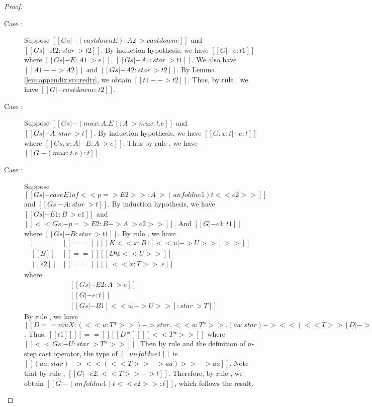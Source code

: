 \begin{proof}
\begin{description}
        \item[Case :] Suppose $[[Gs |- (castdown E) : A2 ~> castdown e]]$ and $[[Gs |- A2 : star ~> t2]]$. By induction hypothesis, we have $[[G |- e : t1]]$ where $[[Gs |- E : A1 ~> e]]$, $[[Gs |- A1 : star ~> t1]]$. We also have $[[A1 --> A2]]$ and $[[Gs |- A2 : star ~> t2]]$. By Lemma \ref{lem:appendix:src:redtr}, we obtain $[[t1 --> t2]]$. Thus, by rule , we have $[[G |- castdown e : t2]]$.
        \item[Case :] Suppose $[[Gs |- (mu x:A . E):A ~> mu x:t.e]]$ and $[[Gs |- A : star ~> t]]$. By induction hypothesis, we have $[[G, x : t |- e : t]]$ where $[[Gs, x:A |- E:A ~> e]]$. Thus by rule , we have $[[G |- (mu x:t.e) : t]]$.
        \item[Case :] Suppose $[[Gs |- case E1 of << p => E2 >> : A ~> (unfoldn e1) t <<e2>>]]$ and $[[Gs |- A : star ~> t]]$. By induction hypothesis, we have $[[Gs |- E1 : B ~> e1]]$ and $[[<< Gs |- p => E2 : B -> A ~> e2 >>]]$. And $[[G |- e1 : t1]]$ where $[[Gs |- B : star ~> t1]]$. By rule , we have
        \begin{align*}
            [[p]] &[[==]] [[K <<x:B1[<< u |-> U >>]>>]] \\
            [[B]] &[[==]] [[D@<<U>>]] \\
            [[e2]] &[[==]] [[\ <<x:T>> .e]]
        \end{align*}
        where
        \begin{align*}
            &[[Gs |- E2 : A ~> e]] \\
            &[[G |- e : t]] \\
            &[[Gs |- B1[<< u |-> U >>]:star ~> T ]]
        \end{align*}
        By rule , we have $[[D == mu X : (<<u:T*>>) -> star . \ <<u:T*>> . (aa:star) -> << (<<T>>[D |-> X] -> aa) >> -> aa]]$. Thus, $[[t1]] [[==]] [[D*]] [[<<T*>>]]$ where $[[<<Gs |- U : star ~> T*>>]]$. Then by rule  and the definition of $n$-step cast operator, the type of $[[unfoldn e1]]$ is $[[(aa:star) -> << (<<T>> -> aa) >> -> aa]]$. Note that by rule , $[[G |- e2 : <<T>> -> t]]$. Therefore, by rule , we obtain $[[G |- (unfoldn e1) t <<e2>> : t]]$, which follows the result.
    \end{description}
\end{proof}

